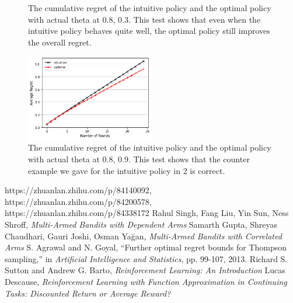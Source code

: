 \documentclass{article}
\begin{document}
\begin{homeworkProblem}
\begin{enumerate}[1.]
\begin{figure}[htp]
            \caption{The cumulative regret of the intuitive policy and the optimal policy with actual theta at 0.8, 0.3. This test shows that even when the intuitive policy behaves quite well, the optimal policy still improves the overall regret.}
            \label{fig6}
        \end{figure}
        \begin{figure}[htp]
            \centering
            \includegraphics[width = 0.5\textwidth]{part2(4).png}
            \caption{The cumulative regret of the intuitive policy and the optimal policy with actual theta at 0.8, 0.9. This test shows that the counter example we gave for the intuitive policy in 2 is correct.}
            \label{fig7}
        \end{figure}
    \end{enumerate}
\end{homeworkProblem}
\pagebreak


\begin{thebibliography}{99}

 https://zhuanlan.zhihu.com/p/84140092, https://zhuanlan.zhihu.com/p/84200578, \\https://zhuanlan.zhihu.com/p/84338172
 Rahul Singh, Fang Liu, Yin Sun, Ness Shroff, \textsl{Multi-Armed Bandits with Dependent Arms}
 Samarth Gupta, Shreyas Chaudhari, Gauri Joshi, Osman Yağan, \textsl{Multi-Armed Bandits with Correlated Arms}
 S. Agrawal and N. Goyal, “Further optimal regret bounds for Thompson sampling,” in \textsl{Artificial Intelligence and Statistics}, pp. 99-107, 2013.
 Richard S. Sutton and Andrew G. Barto, \textsl{Reinforcement Learning: An Introduction}
 Lucas Descause, \textsl{Reinforcement Learning with Function Approximation in Continuing Tasks: Discounted Return or Average Reward?}

\end{thebibliography}
\end{document}
